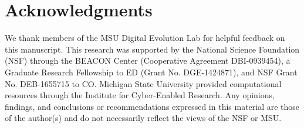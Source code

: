\documentclass[letterpaper]{article}
\begin{document}
\section{Acknowledgments}
We thank members of the MSU Digital Evolution Lab for helpful feedback on this manuscript. This research was supported by the National Science Foundation (NSF) through the BEACON Center (Cooperative Agreement DBI-0939454), a Graduate Research Fellowship to ED (Grant No. DGE-1424871), and NSF Grant No. DEB-1655715 to CO. Michigan State University provided computational resources through the Institute for Cyber-Enabled Research. Any opinions, findings, and conclusions or recommendations expressed in this material are those of the author(s) and do not necessarily reflect the views of the NSF or MSU.



\end{document}
